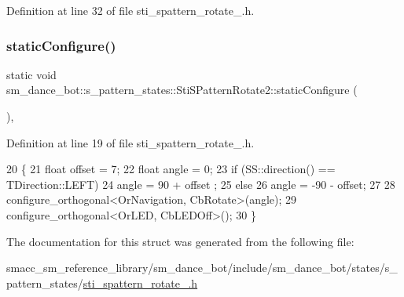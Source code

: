 Definition at line 32 of file sti\+\_\+spattern\+\_\+rotate\+\_.\+h.


\mbox{\label{structsm__dance__bot_1_1s__pattern__states_1_1StiSPatternRotate2_a9f103a22535857ca48e494824c194244}} 
\subsubsection{\texorpdfstring{static\+Configure()}{staticConfigure()}}
{\footnotesize\ttfamily static void sm\+\_\+dance\+\_\+bot\+::s\+\_\+pattern\+\_\+states\+::\+Sti\+S\+Pattern\+Rotate2\+::static\+Configure (\begin{DoxyParamCaption}{ }\end{DoxyParamCaption})\hspace{0.3cm}{\ttfamily [inline]}, {\ttfamily [static]}}



Definition at line 19 of file sti\+\_\+spattern\+\_\+rotate\+\_.\+h.


\begin{DoxyCode}
20     \{
21         \textcolor{keywordtype}{float} offset = 7;
22         \textcolor{keywordtype}{float} angle = 0;
23         \textcolor{keywordflow}{if} (SS::direction() == TDirection::LEFT)
24             angle = 90 + offset ;
25         \textcolor{keywordflow}{else}
26             angle = -90 - offset;
27 
28         configure\_orthogonal<OrNavigation, CbRotate>(angle);
29         configure\_orthogonal<OrLED, CbLEDOff>();
30     \}
\end{DoxyCode}


The documentation for this struct was generated from the following file\+:\begin{DoxyCompactItemize}
\item 
smacc\+\_\+sm\+\_\+reference\+\_\+library/sm\+\_\+dance\+\_\+bot/include/sm\+\_\+dance\+\_\+bot/states/s\+\_\+pattern\+\_\+states/\hyperlink{include_2sm__dance__bot_2states_2s__pattern__states_2sti__spattern__rotate__2_8h}{sti\+\_\+spattern\+\_\+rotate\+\_.\+h}\end{DoxyCompactItemize}
